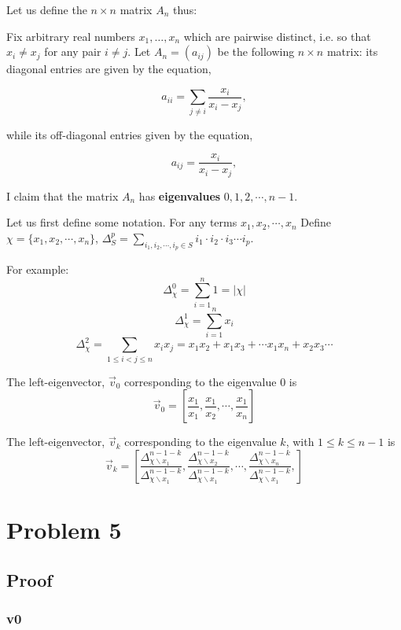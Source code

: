 \documentclass[12pt, a4paper]{article}
\title{}
\author{}
\date{}
\theoremstyle{definition}
\theoremstyle{remark}
\begin{document}
\maketitle

Let us define the $n\times n$ matrix $A_n$ thus:

Fix arbitrary real numbers $x_1,\ldots,x_n$ which are pairwise distinct, i.e. so that $x_i\neq x_j$ for any pair $i\neq j$.  Let $A_n=(a_{ij})$ be the following $n \times n$ matrix:  its diagonal entries are given by the equation,

$$a_{ii} = \sum_{j\neq i}\frac{x_i}{x_i-x_j},$$

while its off-diagonal entries given by the equation,

$$a_{ij} = \frac{x_i}{x_i-x_j},$$

I claim that the matrix $A_n$ has \textbf{eigenvalues} $0,1,2, \cdots, n-1$.

Let us first define some notation.
For any terms $x_1,x_2,\cdots, x_n$ Define $\chi = \{x_1,x_2, \cdots, x_n\}$, $\Delta^p_{S} = \sum_{i_1, i_2, \cdots, i_p \in S}i_1\cdot i_2\cdot i_3\cdots i_p$.

For example:
$$\Delta^0_{\chi} = \sum_{i=1}^{n} 1 = |\chi|$$
$$\Delta^1_{\chi} = \sum_{i=1}^{n} x_i$$
$$\Delta^2_{\chi} = \sum_{1 \leq i<j \leq n} x_ix_j = x_1x_2 + x_1x_3 + \cdots x_1x_n + x_2x_3 \cdots$$

The left-eigenvector, $\vec{v}_0$ corresponding to the eigenvalue $0$ is
$$
	\vec{v}_0 =\left[\dfrac{x_1}{x_1}, \dfrac{x_1}{x_2}, \cdots ,\dfrac{x_1}{x_n}\right]
$$

The left-eigenvector, $\vec{v}_k$ corresponding to the eigenvalue $k$, with $1 \leq k \leq n-1$ is
$$
	\vec{v}_k =
	\left[
		\dfrac{\Delta^{n-1-k}_{\chi \smallsetminus x_1}}{\Delta^{n-1-k}_{\chi \smallsetminus x_1}},
		\dfrac{\Delta^{n-1-k}_{\chi \smallsetminus x_2}}{\Delta^{n-1-k}_{\chi \smallsetminus x_1}},
		\cdots ,
		\dfrac{\Delta^{n-1-k}_{\chi \smallsetminus x_n}}{\Delta^{n-1-k}_{\chi \smallsetminus x_1}},
		\right]
$$

\section{Problem 5}

\subsection{ Proof}

\subsubsection{v0}
\end{document}

